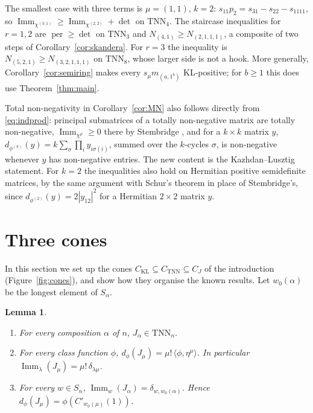 \documentclass[11pt]{amsart}
\newtheorem{lemma}[theorem]{Lemma}
\theoremstyle{definition}
\theoremstyle{remark}
\newcommand{\Imm}{\operatorname{Imm}}
\newcommand{\TNN}{\mathrm{TNN}}
\newcommand{\per}{\operatorname{per}}
\newcommand{\CKL}{C_{\mathrm{KL}}}
\newcommand{\CTNN}{C_{\mathrm{TNN}}}
\newcommand{\CJ}{C_{J}}
\newcommand{\Cp}[1]{C'_{#1}(1)}
\begin{document}
The smallest case with three terms is $\mu=(1,1)$, $k=2$: $s_{11}p_2=s_{31}-s_{22}-s_{1111}$, so $\Imm_{\chi^{(3,1)}}\ge\Imm_{\chi^{(2,2)}}+\det$ on $\TNN_4$. The staircase inequalities for $r=1,2$ are $\per\ge\det$ on $\TNN_3$ and $N_{(4,1)}\ge N_{(2,1,1,1)}$, a composite of two steps of Corollary~\ref{cor:skandera}. For $r=3$ the inequality is $N_{(5,2,1)}\ge N_{(3,2,1,1,1)}$ on $\TNN_8$, whose larger side is not a hook. More generally, Corollary~\ref{cor:semiring} makes every $s_\mu m_{(a,1^b)}$ KL-positive; for $b\ge1$ this does use Theorem~\ref{thm:main}.

Total non-negativity in Corollary~\ref{cor:MN} also follows directly from \eqref{eq:indprod}: principal submatrices of a totally non-negative matrix are totally non-negative, $\Imm_{\chi^\mu}\ge0$ there by Stembridge \cite{Ste91}, and for a $k\times k$ matrix $y$, $d_{\phi^{(k)}}(y)=k\sum_\sigma\prod_iy_{i\sigma(i)}$, summed over the $k$-cycles $\sigma$, is non-negative whenever $y$ has non-negative entries. The new content is the Kazhdan--Lusztig statement. For $k=2$ the inequalities also hold on Hermitian positive semidefinite matrices, by the same argument with Schur's theorem \cite{Sch18} in place of Stembridge's, since $d_{\phi^{(2)}}(y)=2|y_{12}|^2$ for a Hermitian $2\times2$ matrix $y$.

\section{Three cones}\label{sec:cones}

In this section we set up the cones $\CKL\subseteq\CTNN\subseteq\CJ$ of the introduction (Figure~\ref{fig:cones}), and show how they organise the known results. Let $w_0(\alpha)$ be the longest element of $S_\alpha$.

\begin{lemma}\label{lem:J}
\begin{enumerate}
\item For every composition $\alpha$ of $n$, $J_\alpha\in\TNN_n$.
\item For every class function $\phi$, $d_\phi(J_\mu)=\mu!\,\langle\phi,\eta^\mu\rangle$. In particular $\Imm_\lambda(J_\mu)=\mu!\,\delta_{\lambda\mu}$.
\item For every $w\in S_n$, $\Imm_w(J_\alpha)=\delta_{w,w_0(\alpha)}$. Hence $d_\phi(J_\mu)=\phi(\Cp{w_0(\mu)})$.
\end{enumerate}
\end{lemma}
\end{document}
